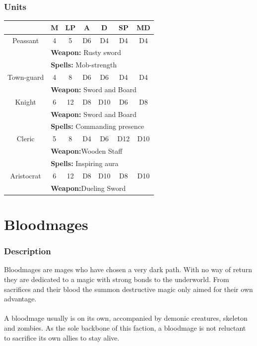 \documentclass[a5paper,pagesize,10pt,bibtotoc,pointlessnumbers,
normalheadings,DIV=9,twoside=false]{scrbook}
\begin{document}
\subsubsection{Units}
 \begin{tabular}{||c c c c c c c||} 
 \hline
  & M & LP & A & D & SP & MD \\
 \hline\hline
 Peassant & 4 & 5 & D6 & D4 & D4 & D4 \\ 
  & \multicolumn{6}{l||}{\textbf{Weapon:} Rusty sword} \\
  & \multicolumn{6}{l||}{\textbf{Spells:} Mob-strength} \\
 \hline
  Town-guard & 4 & 8 & D6 & D6 & D4 & D4 \\ 
  & \multicolumn{6}{l||}{\textbf{Weapon:} Sword and Board} \\
 \hline
 Knight & 6  & 12 & D8 & D10 & D6 & D8 \\
  & \multicolumn{6}{l||}{\textbf{Weapon:} Sword and Board} \\
  & \multicolumn{6}{l||}{\textbf{Spells:} Commanding presence} \\
  \hline
Cleric & 5 & 8 & D4 & D6 & D12 & D10 \\
  & \multicolumn{6}{l||}{\textbf{Weapon:}Wooden Staff} \\
  & \multicolumn{6}{l||}{\textbf{Spells:} Inspiring aura} \\
 \hline
 Aristocrat & 6 & 12 & D8 & D10 & D8 & D10 \\
   & \multicolumn{6}{l||}{\textbf{Weapon:}Dueling Sword} \\
 \hline

\end{tabular}

\newpage
\section{Bloodmages}

\subsubsection{Description}
Bloodmages are mages who have chosen a very dark path. With no way of return they are dedicated to a magic with strong bonds to the underworld.
From sacrifices and their blood the summon destructive magic only aimed for their own advantage.\\
\\
A bloodmage usually is on its own, accompanied by demonic creatures, skeleton and zombies. As the sole backbone of this faction, a bloodmage is not reluctant to sacrifice its own allies to stay alive.
\end{document}
